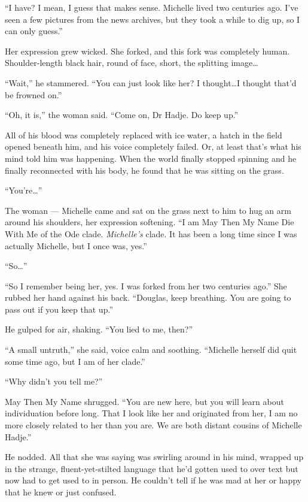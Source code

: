 ``I have? I mean, I guess that makes sense. Michelle lived two centuries ago. I've seen a few pictures from the news archives, but they took a while to dig up, so I can only guess.''

Her expression grew wicked. She forked, and this fork was completely human. Shoulder-length black hair, round of face, short, the splitting image\ldots{}

``Wait,'' he stammered. ``You can just look like her? I thought\ldots I thought that'd be frowned on.''

``Oh, it is,'' the woman said. ``Come on, Dr Hadje. Do keep up.''

All of his blood was completely replaced with ice water, a hatch in the field opened beneath him, and his voice completely failed. Or, at least that's what his mind told him was happening. When the world finally stopped spinning and he finally reconnected with his body, he found that he was sitting on the grass.

``You're\ldots{}''

The woman — Michelle came and sat on the grass next to him to hug an arm around his shoulders, her expression softening. ``I am May Then My Name Die With Me of the Ode clade. \emph{Michelle's} clade. It has been a long time since I was actually Michelle, but I once was, yes.''

``So\ldots{}''

``So I remember being her, yes. I was forked from her two centuries ago.'' She rubbed her hand against his back. ``Douglas, keep breathing. You are going to pass out if you keep that up.''

He gulped for air, shaking. ``You lied to me, then?''

``A small untruth,'' she said, voice calm and soothing. ``Michelle herself did quit some time ago, but I am of her clade.''

``Why didn't you tell me?''

May Then My Name shrugged. ``You are new here, but you will learn about individuation before long. That I look like her and originated from her, I am no more closely related to her than you are. We are both distant cousins of Michelle Hadje.''

He nodded. All that she was saying was swirling around in his mind, wrapped up in the strange, fluent-yet-stilted language that he'd gotten used to over text but now had to get used to in person. He couldn't tell if he was mad at her or happy that he knew or just confused.


